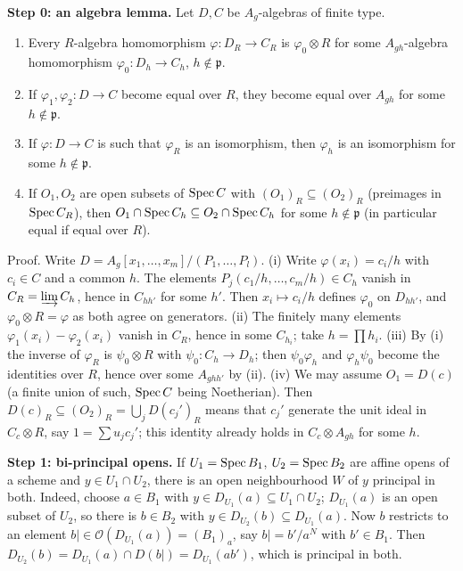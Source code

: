 \documentclass[11pt]{article}
\begin{document}
\textbf{Step 0: an algebra lemma.} Let $D,C$ be $A_g$-algebras of finite type.
\begin{enumerate}[label=(\roman*),leftmargin=*]
\item Every $R$-algebra homomorphism $\varphi:D_R\to C_R$ is $\varphi_0\otimes R$ for some $A_{gh}$-algebra homomorphism $\varphi_0:D_h\to C_h$, $h\notin\mathfrak p$.
\item If $\varphi_1,\varphi_2:D\to C$ become equal over $R$, they become equal over $A_{gh}$ for some $h\notin\mathfrak p$.
\item If $\varphi:D\to C$ is such that $\varphi_R$ is an isomorphism, then $\varphi_h$ is an isomorphism for some $h\notin\mathfrak p$.
\item If $O_1,O_2$ are open subsets of $\operatorname{Spec} C$ with $(O_1)_R\subseteq(O_2)_R$ (preimages in $\operatorname{Spec} C_R$), then $O_1\cap\operatorname{Spec} C_h\subseteq O_2\cap\operatorname{Spec} C_h$ for some $h\notin\mathfrak p$ (in particular equal if equal over $R$).
\end{enumerate}
Proof. Write $D=A_g[x_1,\dots,x_m]/(P_1,\dots,P_l)$. (i) Write $\varphi(x_i)=c_i/h$ with $c_i\in C$ and a common $h$. The elements $P_j(c_1/h,\dots,c_m/h)\in C_h$ vanish in $C_R=\varinjlim C_h$, hence in $C_{hh'}$ for some $h'$. Then $x_i\mapsto c_i/h$ defines $\varphi_0$ on $D_{hh'}$, and $\varphi_0\otimes R=\varphi$ as both agree on generators. (ii) The finitely many elements $\varphi_1(x_i)-\varphi_2(x_i)$ vanish in $C_R$, hence in some $C_{h_i}$; take $h=\prod h_i$. (iii) By (i) the inverse of $\varphi_R$ is $\psi_0\otimes R$ with $\psi_0:C_h\to D_h$; then $\psi_0\varphi_h$ and $\varphi_h\psi_0$ become the identities over $R$, hence over some $A_{ghh'}$ by (ii). (iv) We may assume $O_1=D(c)$ (a finite union of such, $\operatorname{Spec} C$ being Noetherian). Then $D(c)_R\subseteq(O_2)_R=\bigcup_jD(c_j')_R$ means that $c_j'$ generate the unit ideal in $C_{c}\otimes R$, say $1=\sum u_jc_j'$; this identity already holds in $C_c\otimes A_{gh}$ for some $h$.

\textbf{Step 1: bi-principal opens.} If $U_1=\operatorname{Spec} B_1$, $U_2=\operatorname{Spec} B_2$ are affine opens of a scheme and $y\in U_1\cap U_2$, there is an open neighbourhood $W$ of $y$ principal in both. Indeed, choose $a\in B_1$ with $y\in D_{U_1}(a)\subseteq U_1\cap U_2$; $D_{U_1}(a)$ is an open subset of $U_2$, so there is $b\in B_2$ with $y\in D_{U_2}(b)\subseteq D_{U_1}(a)$. Now $b$ restricts to an element $b|\in\mathcal O(D_{U_1}(a))=(B_1)_a$, say $b|=b'/a^N$ with $b'\in B_1$. Then $D_{U_2}(b)=D_{U_1}(a)\cap D(b|)=D_{U_1}(ab')$, which is principal in both.
\end{document}
